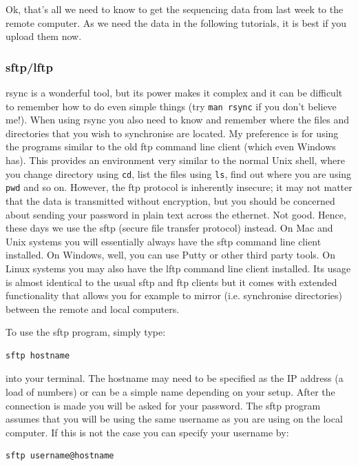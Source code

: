 \documentclass[11pt]{article}
\begin{document}
Ok, that's all we need to know to get the sequencing data from last
week to the remote computer. As we need the data in the following
tutorials, it is best if you upload them now.

\subsubsection{sftp/lftp}
\label{sec:orgheadline12}
rsync is a wonderful tool, but its power makes it complex and it can be
difficult to remember how to do even simple things (try \texttt{man rsync} if
you don't believe me!). When using rsync you also need to know and
remember where the files and directories that you wish to synchronise
are located. My preference is for using
the programs similar to the old ftp command line client (which even Windows has). 
This provides an
environment very similar to the normal Unix shell, where you change
directory using \texttt{cd}, list the files using \texttt{ls}, find out where you are
using \texttt{pwd} and so on. However, the ftp protocol is inherently insecure;
it may not matter that the data is transmitted without encryption, but
you should be concerned about sending your password in plain text
across the ethernet. Not good. Hence, these days we use the sftp (secure
file transfer protocol) instead. On Mac and Unix systems you will
essentially always have the sftp command line client installed. On
Windows, well, you can use Putty or other third party tools. On Linux
systems you may also have the lftp command line client installed. Its
usage is almost identical to the usual sftp and ftp clients but it comes
with extended functionality that allows you for example to mirror (i.e.
synchronise directories) between the remote and local computers.

To use the sftp program, simply type:

\begin{verbatim}
sftp hostname
\end{verbatim}

into your terminal. The hostname may need to be specified as the IP
address (a load of numbers) or can be a simple name depending on your
setup. After the connection is made you will be asked for your password.
The sftp program assumes that you will be using the same username as you
are using on the local computer. If this is not the case you can specify
your username by:

\begin{verbatim}
sftp username@hostname
\end{verbatim}
\end{document}
